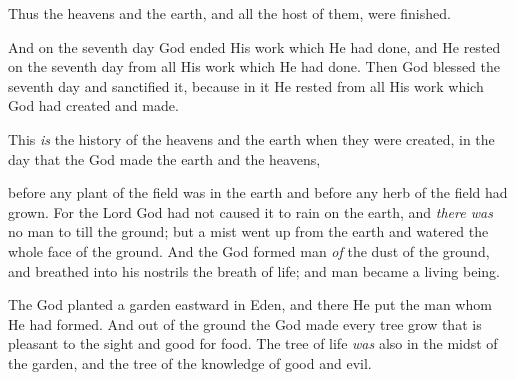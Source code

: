

\bverse Thus the heavens and the earth, and all the host of them, were finished.

\bverse And on the seventh day God ended His work which He had done, and He rested on the seventh day from all His work which He had done.
\bverse Then God blessed the seventh day and sanctified it, because in it He rested from all His work which God had created and made.
		
\bverse This \textit{is} the history of the heavens and the earth when they were created, in the day that the  God made the earth and the heavens,
	
\bverse before any plant of the field was in the earth and before any herb of the field had grown. For the Lord God had not caused it to rain on the earth, and \textit{there was} no man to till the ground;
\bverse but a mist went up from the earth and watered the whole face of the ground.
\bverse And the \lord God formed man \textit{of} the dust of the ground, and breathed into his nostrils the breath of life; and man became a living being.

\bverse The \lord God planted a garden eastward in Eden, and there He put the man whom He had formed.
\bverse And out of the ground the \lord God made every tree grow that is pleasant to the sight and good for food. The tree of life \textit{was} also in the midst of the garden, and the tree of the knowledge of good and evil.

